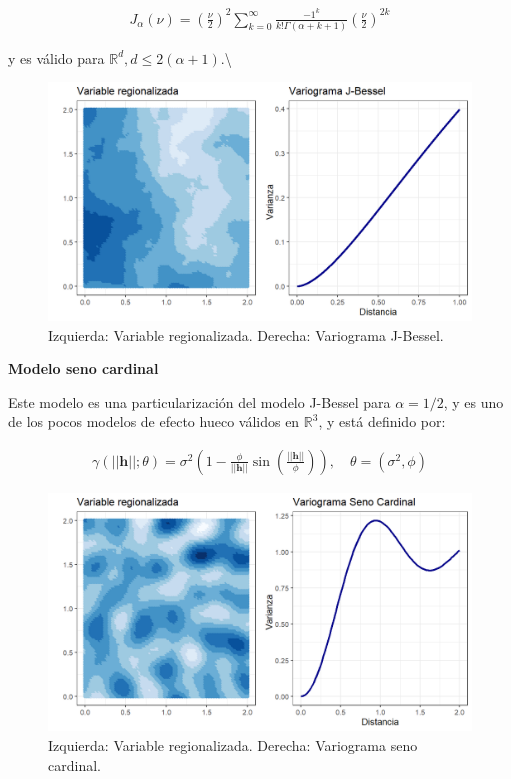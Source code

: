 \documentclass[
]{book}
\begin{document}
\begin{align}
    J_\alpha (\nu) =\left(\frac{\nu}{2}\right)^2 \sum_{k=0}^\infty{{\frac{-1^k}{k!\Gamma(\alpha+k+1)}}{\left(\frac{\nu}{2}\right)^{2k}}}
\end{align}

y es válido para \(\mathbb{R}^d, d\leq 2(\alpha+1)\).\textbackslash{}

\begin{figure}
\includegraphics[width=17.78in]{figuras/otros/bes_var} \caption{Izquierda: Variable regionalizada. Derecha: Variograma J-Bessel.}\label{fig:besvar}
\end{figure}

\textbf{Modelo seno cardinal}

Este modelo es una particularización del modelo J-Bessel para \(\alpha=1/2\), y es uno de los pocos modelos de efecto hueco válidos en \(\mathbb{R}^3\), y está definido por:

\begin{align}
    \gamma(||\textbf{h}||;\theta)=\sigma^2 \left(1-\frac{\phi}{||\textbf{h}||}\sin\left(\frac{||\textbf{h}||}{\phi} \right)  \right),\quad \theta=(\sigma^2,\phi)
\end{align}

\begin{figure}
\includegraphics[width=17.78in]{figuras/otros/sin_var} \caption{Izquierda: Variable regionalizada. Derecha: Variograma seno cardinal.}\label{fig:sinvar}
\end{figure}
\end{document}
